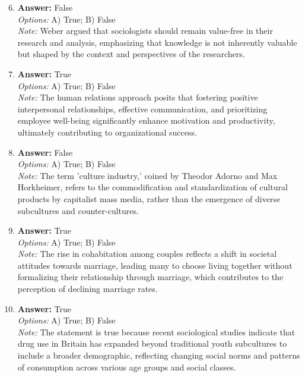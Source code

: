 \documentclass[12pt]{article}
\begin{document}
\begin{enumerate}[label=\arabic*.]
\setcounter{enumi}{5}
\item \textbf{Answer:} False
\\ \textit{Options:} A) True; B) False
\\ \textit{Note:} Weber argued that sociologists should remain value-free in their research and analysis, emphasizing that knowledge is not inherently valuable but shaped by the context and perspectives of the researchers.
\item \textbf{Answer:} True
\\ \textit{Options:} A) True; B) False
\\ \textit{Note:} The human relations approach posits that fostering positive interpersonal relationships, effective communication, and prioritizing employee well-being significantly enhance motivation and productivity, ultimately contributing to organizational success.
\item \textbf{Answer:} False
\\ \textit{Options:} A) True; B) False
\\ \textit{Note:} The term 'culture industry,' coined by Theodor Adorno and Max Horkheimer, refers to the commodification and standardization of cultural products by capitalist mass media, rather than the emergence of diverse subcultures and counter-cultures.
\item \textbf{Answer:} True
\\ \textit{Options:} A) True; B) False
\\ \textit{Note:} The rise in cohabitation among couples reflects a shift in societal attitudes towards marriage, leading many to choose living together without formalizing their relationship through marriage, which contributes to the perception of declining marriage rates.
\item \textbf{Answer:} True
\\ \textit{Options:} A) True; B) False
\\ \textit{Note:} The statement is true because recent sociological studies indicate that drug use in Britain has expanded beyond traditional youth subcultures to include a broader demographic, reflecting changing social norms and patterns of consumption across various age groups and social classes.
\end{enumerate}
\end{document}
